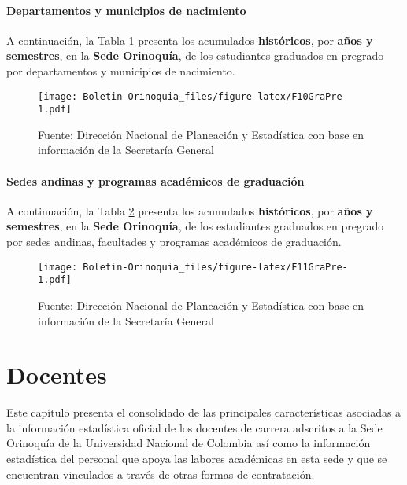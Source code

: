 \documentclass[
]{book}
\begin{document}
\hypertarget{departamentos-y-municipios-de-nacimiento}{%
\subsubsection{Departamentos y municipios de nacimiento}\label{departamentos-y-municipios-de-nacimiento}}

A continuación, la Tabla \ref{fig:F10GraPre} presenta los acumulados \textbf{históricos}, por \textbf{años y semestres}, en la \textbf{Sede Orinoquía}, de los estudiantes graduados en pregrado por departamentos y municipios de nacimiento.

\begin{figure}
\centering
\texttt{[image: Boletin-Orinoquia\_files/figure-latex/F10GraPre-1.pdf]}
\caption{\label{fig:F10GraPre}Fuente: Dirección Nacional de Planeación y Estadística con base en información de la Secretaría General}
\end{figure}

\hypertarget{sedes-andinas-y-programas-acaduxe9micos-de-graduaciuxf3n}{%
\subsubsection{Sedes andinas y programas académicos de graduación}\label{sedes-andinas-y-programas-acaduxe9micos-de-graduaciuxf3n}}

A continuación, la Tabla \ref{fig:F11GraPre} presenta los acumulados \textbf{históricos}, por \textbf{años y semestres}, en la \textbf{Sede Orinoquía}, de los estudiantes graduados en pregrado por sedes andinas, facultades y programas académicos de graduación.

\begin{figure}
\centering
\texttt{[image: Boletin-Orinoquia\_files/figure-latex/F11GraPre-1.pdf]}
\caption{\label{fig:F11GraPre}Fuente: Dirección Nacional de Planeación y Estadística con base en información de la Secretaría General}
\end{figure}

\hypertarget{Doc}{%
\chapter{Docentes}\label{Doc}}

Este capítulo presenta el consolidado de las principales características asociadas a la información estadística oficial de los docentes de carrera adscritos a la Sede Orinoquía de la Universidad Nacional de Colombia así como la información estadística del personal que apoya las labores académicas en esta sede y que se encuentran vinculados a través de otras formas de contratación.
\end{document}
